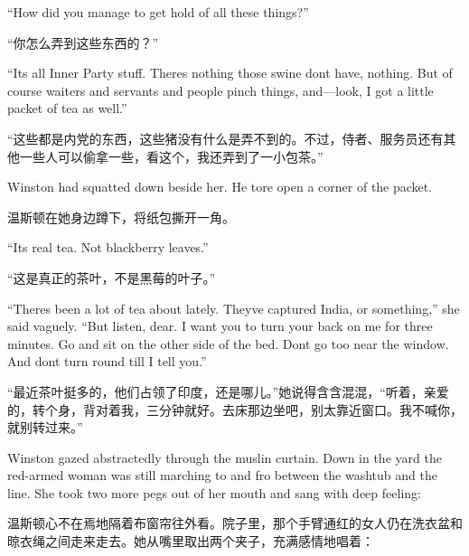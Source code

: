 \begin{paracol}{2}
``How did you manage to get hold of all these things?''

\switchcolumn

``你怎么弄到这些东西的？''

\switchcolumn*

``It\textquotesingle s all Inner Party stuff. There\textquotesingle s
nothing those swine don\textquotesingle t have, nothing. But of course
waiters and servants and people pinch things, and---look, I got a little
packet of tea as well.''

\switchcolumn

``这些都是内党的东西，这些猪没有什么是弄不到的。不过，侍者、服务员还有其他一些人可以偷拿一些，看这个，我还弄到了一小包茶。''

\switchcolumn*

Winston had squatted down beside her. He tore open a corner of the
packet.

\switchcolumn

温斯顿在她身边蹲下，将纸包撕开一角。

\switchcolumn*

``It\textquotesingle s real tea. Not blackberry leaves.''

\switchcolumn

``这是真正的茶叶，不是黑莓的叶子。''

\switchcolumn*

``There\textquotesingle s been a lot of tea about lately.
They\textquotesingle ve captured India, or something,'' she said vaguely.
``But listen, dear. I want you to turn your back on me for three minutes.
Go and sit on the other side of the bed. Don\textquotesingle t go too
near the window. And don\textquotesingle t turn round till I tell you.''

\switchcolumn

``最近茶叶挺多的，他们占领了印度，还是哪儿。''她说得含含混混，``听着，亲爱的，转个身，背对着我，三分钟就好。去床那边坐吧，别太靠近窗口。我不喊你，就别转过来。''

\switchcolumn*

Winston gazed abstractedly through the muslin curtain. Down in the yard
the red-armed woman was still marching to and fro between the washtub
and the line. She took two more pegs out of her mouth and sang with deep
feeling:

\switchcolumn

温斯顿心不在焉地隔着布窗帘往外看。院子里，那个手臂通红的女人仍在洗衣盆和晾衣绳之间走来走去。她从嘴里取出两个夹子，充满感情地唱着：


\end{paracol}
